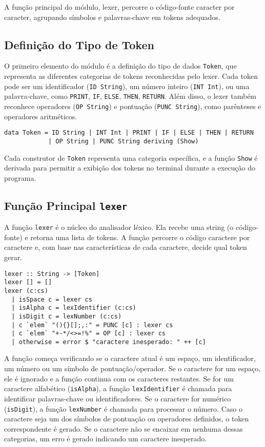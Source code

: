 \documentclass{article}
\begin{document}
A função principal do módulo, lexer, percorre o código-fonte caracter por caracter, agrupando símbolos e palavras-chave em tokens adequados.

\subsection{Definição do Tipo de Token}

O primeiro elemento do módulo é a definição do tipo de dados \texttt{Token}, que representa as diferentes categorias de tokens reconhecidas pelo lexer. Cada token pode ser um identificador (\texttt{ID String}), um número inteiro (\texttt{INT Int}), ou uma palavra-chave, como \texttt{PRINT}, \texttt{IF}, \texttt{ELSE}, \texttt{THEN}, \texttt{RETURN}. Além disso, o lexer também reconhece operadores (\texttt{OP String}) e pontuação (\texttt{PUNC String}), como parênteses e operadores aritméticos.

\begin{verbatim}
data Token = ID String | INT Int | PRINT | IF | ELSE | THEN | RETURN 
            | OP String | PUNC String deriving (Show)
\end{verbatim}

Cada construtor de \texttt{Token} representa uma categoria específica, e a função \texttt{Show} é derivada para permitir a exibição dos tokens no terminal durante a execução do programa.

\subsection{Função Principal \texttt{lexer}}

A função \texttt{lexer} é o núcleo do analisador léxico. Ela recebe uma string (o código-fonte) e retorna uma lista de tokens. A função percorre o código caractere por caractere e, com base nas características de cada caractere, decide qual token gerar.

\begin{verbatim}
lexer :: String -> [Token]
lexer [] = []
lexer (c:cs)
  | isSpace c = lexer cs
  | isAlpha c = lexIdentifier (c:cs)
  | isDigit c = lexNumber (c:cs)
  | c `elem` "(){}[];,:" = PUNC [c] : lexer cs
  | c `elem` "+-*/<>=!%" = OP [c] : lexer cs
  | otherwise = error $ "caractere inesperado: " ++ [c]
\end{verbatim}

A função começa verificando se o caractere atual é um espaço, um identificador, um número ou um símbolo de pontuação/operador. Se o caractere for um espaço, ele é ignorado e a função continua com os caracteres restantes. Se for um caractere alfabético (\texttt{isAlpha}), a função \texttt{lexIdentifier} é chamada para identificar palavras-chave ou identificadores. Se o caractere for numérico (\texttt{isDigit}), a função \texttt{lexNumber} é chamada para processar o número. Caso o caractere seja um dos símbolos de pontuação ou operadores definidos, o token correspondente é gerado. Se o caractere não se encaixar em nenhuma dessas categorias, um erro é gerado indicando um caractere inesperado.
\end{document}
